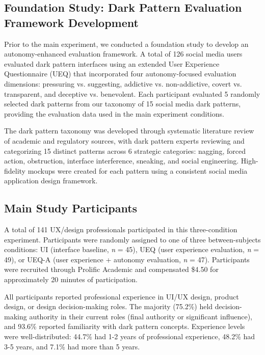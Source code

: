 
\subsection{Foundation Study: Dark Pattern Evaluation Framework Development}

Prior to the main experiment, we conducted a foundation study to develop an autonomy-enhanced evaluation framework. A total of 126 social media users evaluated dark pattern interfaces using an extended User Experience Questionnaire (UEQ) that incorporated four autonomy-focused evaluation dimensions: pressuring vs. suggesting, addictive vs. non-addictive, covert vs. transparent, and deceptive vs. benevolent. Each participant evaluated 5 randomly selected dark patterns from our taxonomy of 15 social media dark patterns, providing the evaluation data used in the main experiment conditions.

The dark pattern taxonomy was developed through systematic literature review of academic and regulatory sources, with dark pattern experts reviewing and categorizing 15 distinct patterns across 6 strategic categories: nagging, forced action, obstruction, interface interference, sneaking, and social engineering. High-fidelity mockups were created for each pattern using a consistent social media application design framework.

\subsection{Main Study Participants}

A total of 141 UX/design professionals participated in this three-condition experiment. Participants were randomly assigned to one of three between-subjects conditions: UI (interface baseline, \textit{n} = 45), UEQ (user experience evaluation, \textit{n} = 49), or UEQ-A (user experience + autonomy evaluation, \textit{n} = 47). Participants were recruited through Prolific Academic and compensated \$4.50 for approximately 20 minutes of participation. 

All participants reported professional experience in UI/UX design, product design, or design decision-making roles. The majority (75.2\%) held decision-making authority in their current roles (final authority or significant influence), and 93.6\% reported familiarity with dark pattern concepts. Experience levels were well-distributed: 44.7\% had 1-2 years of professional experience, 48.2\% had 3-5 years, and 7.1\% had more than 5 years.

